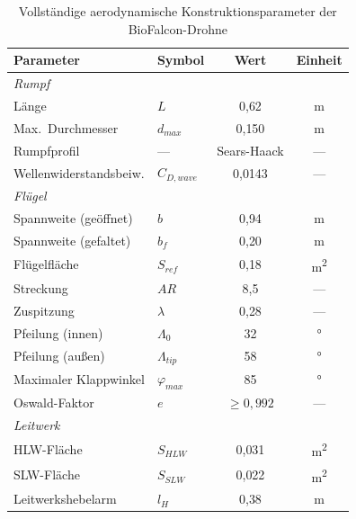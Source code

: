 ﻿\documentclass[12pt,a4paper]{article}
\theoremstyle{remark}
\begin{document}
	\begin{table}[H]
		\centering
		\caption{Vollständige aerodynamische Konstruktionsparameter der BioFalcon-Drohne}
		\label{tab:kons_param}
		\begin{tabular}{llcc}
			\toprule
			\textbf{Parameter} & \textbf{Symbol} & \textbf{Wert} & \textbf{Einheit} \\
			\midrule
			\multicolumn{4}{l}{\textit{Rumpf}} \\
			Länge                    & $L$           & 0{,}62    & \si{\m}               \\
			Max.\ Durchmesser        & $d_{max}$     & 0{,}150   & \si{\m}               \\
			Rumpfprofil              & ---           & Sears-Haack & ---                 \\
			Wellenwiderstandsbeiw.   & $C_{D,wave}$  & 0{,}0143  & ---                   \\
			\midrule
			\multicolumn{4}{l}{\textit{Flügel}} \\
			Spannweite (geöffnet)    & $b$           & 0{,}94    & \si{\m}               \\
			Spannweite (gefaltet)    & $b_f$         & 0{,}20    & \si{\m}               \\
			Flügelfläche             & $S_{ref}$     & 0{,}18    & \si{\m^2}             \\
			Streckung                & $AR$          & 8{,}5     & ---                   \\
			Zuspitzung               & $\lambda$     & 0{,}28    & ---                   \\
			Pfeilung (innen)         & $\Lambda_0$   & 32        & \si{\degree}          \\
			Pfeilung (außen)         & $\Lambda_{tip}$ & 58      & \si{\degree}          \\
			Maximaler Klappwinkel    & $\varphi_{max}$ & 85      & \si{\degree}          \\
			Oswald-Faktor            & $e$           & $\geq 0{,}992$ & ---              \\
			\midrule
			\multicolumn{4}{l}{\textit{Leitwerk}} \\
			HLW-Fläche               & $S_{HLW}$     & 0{,}031   & \si{\m^2}             \\
			SLW-Fläche               & $S_{SLW}$     & 0{,}022   & \si{\m^2}             \\
			Leitwerkshebelarm        & $l_H$         & 0{,}38    & \si{\m}               \\

\end{tabular}
\end{table}
\end{document}
